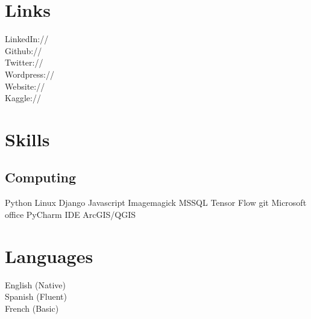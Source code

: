 \documentclass[]{JOC_CV}
\begin{document}
\begin{minipage}[t]{0.33\textwidth}

\section{Links}\label{sec:links}
LinkedIn://  \href{https://www.linkedin.com/in/jamesoconnor12/}{} \\
Github:// \href{https://github.com/JamesOConnor}{} \\
Twitter://  \href{https://twitter.com/James\_o\_connor1}{} \\
Wordpress://  \href{https://jamesoconnorkingston.wordpress.com}{} \\
Website://  \href{http://www.jp-oconnor.com}{} \\
Kaggle://  \href{https://www.kaggle.com/james0c}{}
\sectionsep


\section{Skills}\label{sec:skills}
\subsection{Computing}\label{subsec:computing}
Python \textbullet{} Linux \textbullet{} Django \textbullet{} Javascript \textbullet{} Imagemagick \textbullet{} MSSQL \textbullet{} Tensor Flow \textbullet{} git \linebreak
{}
Microsoft office \textbullet{} PyCharm IDE \textbullet{} ArcGIS/QGIS
\sectionsep


\section{Languages}\label{sec:languages}
English (Native) \\
Spanish (Fluent) \\
French (Basic) \\
\sectionsep

%
%

\end{minipage}
\end{document}
